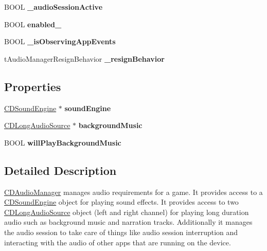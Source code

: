 \begin{DoxyCompactItemize}
\item 
\hypertarget{interface_c_d_audio_manager_a01b2f1870ef239d99027e67833d24283}{B\-O\-O\-L {\bfseries \-\_\-audio\-Session\-Active}}\label{interface_c_d_audio_manager_a01b2f1870ef239d99027e67833d24283}

\item 
\hypertarget{interface_c_d_audio_manager_a91ce224485b38f8cbdd32443b73fa72d}{B\-O\-O\-L {\bfseries enabled\-\_\-}}\label{interface_c_d_audio_manager_a91ce224485b38f8cbdd32443b73fa72d}

\item 
\hypertarget{interface_c_d_audio_manager_aca6d7170a7ac7e6c0b109d3805fc2cb3}{B\-O\-O\-L {\bfseries \-\_\-is\-Observing\-App\-Events}}\label{interface_c_d_audio_manager_aca6d7170a7ac7e6c0b109d3805fc2cb3}

\item 
\hypertarget{interface_c_d_audio_manager_ad993da9d1c8f07f50ff6e9bc5481f774}{t\-Audio\-Manager\-Resign\-Behavior {\bfseries \-\_\-resign\-Behavior}}\label{interface_c_d_audio_manager_ad993da9d1c8f07f50ff6e9bc5481f774}

\end{DoxyCompactItemize}
\subsection*{Properties}
\begin{DoxyCompactItemize}
\item 
\hypertarget{interface_c_d_audio_manager_a803ed647e9c1e174a5c03ded3b76dd63}{\hyperlink{interface_c_d_sound_engine}{C\-D\-Sound\-Engine} $\ast$ {\bfseries sound\-Engine}}\label{interface_c_d_audio_manager_a803ed647e9c1e174a5c03ded3b76dd63}

\item 
\hypertarget{interface_c_d_audio_manager_a533f9e39b345dfebf5708f3411cd5484}{\hyperlink{interface_c_d_long_audio_source}{C\-D\-Long\-Audio\-Source} $\ast$ {\bfseries background\-Music}}\label{interface_c_d_audio_manager_a533f9e39b345dfebf5708f3411cd5484}

\item 
\hypertarget{interface_c_d_audio_manager_aca1dba6de45c7939fa8cec46d2500ece}{B\-O\-O\-L {\bfseries will\-Play\-Background\-Music}}\label{interface_c_d_audio_manager_aca1dba6de45c7939fa8cec46d2500ece}

\end{DoxyCompactItemize}


\subsection{Detailed Description}
\hyperlink{interface_c_d_audio_manager}{C\-D\-Audio\-Manager} manages audio requirements for a game. It provides access to a \hyperlink{interface_c_d_sound_engine}{C\-D\-Sound\-Engine} object for playing sound effects. It provides access to two \hyperlink{interface_c_d_long_audio_source}{C\-D\-Long\-Audio\-Source} object (left and right channel) for playing long duration audio such as background music and narration tracks. Additionally it manages the audio session to take care of things like audio session interruption and interacting with the audio of other apps that are running on the device.

